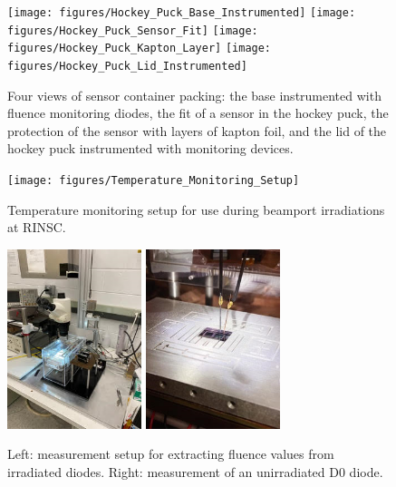 \begin{figure}[!hbt]
  \begin{center}
    \texttt{[image: figures/Hockey\_Puck\_Base\_Instrumented]}  
    \texttt{[image: figures/Hockey\_Puck\_Sensor\_Fit]}
    \texttt{[image: figures/Hockey\_Puck\_Kapton\_Layer]}
    \texttt{[image: figures/Hockey\_Puck\_Lid\_Instrumented]}    
    \caption{Four views of sensor container packing: the base instrumented with fluence monitoring diodes, the fit of a sensor in the hockey puck, the protection of the sensor with layers of kapton foil, and the lid of the hockey puck instrumented with monitoring devices.}
    \label{fig:Puck_Packing}
  \end{center}
\end{figure}

\begin{figure}[!hbt]
  \begin{center}
    \texttt{[image: figures/Temperature\_Monitoring\_Setup]}
    \caption{Temperature monitoring setup for use during beamport irradiations at RINSC.}
    \label{fig:Temperature_Monitoring_Setup}
  \end{center}
\end{figure}

\begin{figure}[!hbt]
  \begin{center}
    \includegraphics[width=0.35\textwidth]{figures/CVIV_Setup}
    \includegraphics[width=0.35\textwidth]{figures/D0_Measurement}
    \caption{Left: measurement setup for extracting fluence values from irradiated diodes. Right: measurement of an unirradiated D0 diode.}
    \label{fig:Fluence_Measurement_Setup}
  \end{center}
\end{figure}

